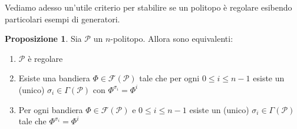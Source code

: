 \documentclass[a4paper,12pt]{report}
\newcommand{\p}{\mathcal{P}}
\theoremstyle{plain}
\theoremstyle{definition}
\newtheorem{prop}[teo]{Proposizione}
\newcommand\locallabel[1]{\label{\currentprefix_#1}}
\newcommand\flag[1]{\mathcal{F}(#1)}
\begin{document}
Vediamo adesso un'utile criterio per stabilire se un politopo \`e regolare esibendo particolari esempi di generatori.
\begin{prop}
\def\currentprefix{prop:IntroInvolutions}
\label{prop:IntroInvolutions}
Sia $\p$ un $n$-politopo. Allora sono equivalenti:
\begin{enumerate}
\item\locallabel{1}$\p$ \`e regolare
\item\locallabel{2}Esiste una bandiera $\Phi\in\flag{\p}$ tale che per ogni $0\leq i\leq n-1$ esiste un (unico) $\sigma_i\in\Gamma(\p)$ con
$\Phi^{\sigma_i}=\Phi^i$
\item\locallabel{3}Per ogni bandiera $\Phi\in\flag{\p}$ e $0\leq i\leq n-1$ esiste un (unico) $\sigma_i\in\Gamma(\p)$ tale che
$\Phi^{\sigma_i}=\Phi^i$
\end{enumerate}
\end{prop}
\end{document}
